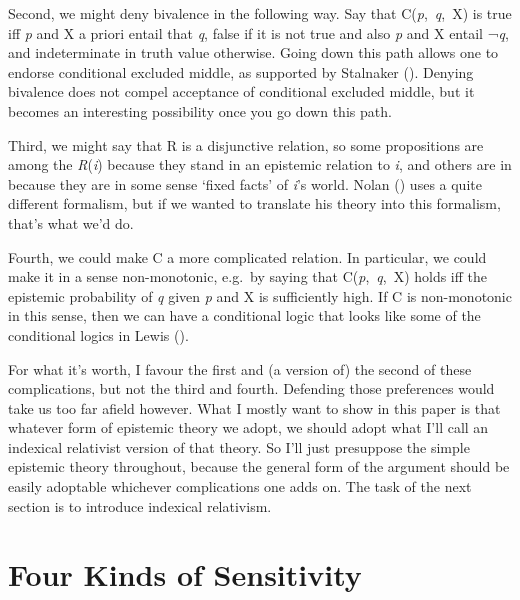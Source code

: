 \documentclass[
  10pt,
  letterpaper,
  DIV=11,
  numbers=noendperiod,
  twoside]{scrartcl}
\begin{document}
Second, we might deny bivalence in the following way. Say that
C(\emph{p},~\emph{q},~X) is true iff \emph{p} and X a priori entail that
\emph{q}, false if it is not true and also \emph{p} and X entail
¬\emph{q}, and indeterminate in truth value otherwise. Going down this
path allows one to endorse conditional excluded middle, as supported by
Stalnaker (). Denying bivalence does
not compel acceptance of conditional excluded middle, but it becomes an
interesting possibility once you go down this path.

Third, we might say that R is a disjunctive relation, so some
propositions are among the \emph{R}(\emph{i}) because they stand in an
epistemic relation to \emph{i}, and others are in because they are in
some sense `fixed facts' of \emph{i}'s world. Nolan
() uses a quite different formalism, but
if we wanted to translate his theory into this formalism, that's what
we'd do.

Fourth, we could make C a more complicated relation. In particular, we
could make it in a sense non-monotonic, e.g.~by saying that
C(\emph{p},~\emph{q},~X) holds iff the epistemic probability of \emph{q}
given \emph{p} and X is sufficiently high. If C is non-monotonic in this
sense, then we can have a conditional logic that looks like some of the
conditional logics in Lewis ().

For what it's worth, I favour the first and (a version of) the second of
these complications, but not the third and fourth. Defending those
preferences would take us too far afield however. What I mostly want to
show in this paper is that whatever form of epistemic theory we adopt,
we should adopt what I'll call an indexical relativist version of that
theory. So I'll just presuppose the simple epistemic theory throughout,
because the general form of the argument should be easily adoptable
whichever complications one adds on. The task of the next section is to
introduce indexical relativism.

\section{Four Kinds of Sensitivity}\label{four-kinds-of-sensitivity}
\end{document}
